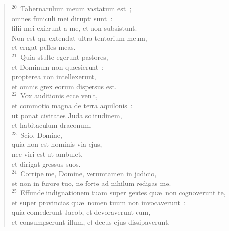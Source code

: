 \begin{flushleft}
\begin{verse}
${}^{20}$~Tabernaculum meum vastatum est~;\\ omnes funiculi mei dirupti sunt~:\\ filii mei exierunt a me, et non subsistunt.\\ Non est qui extendat ultra tentorium meum,\\ et erigat pelles meas.\\
${}^{21}$~Quia stulte egerunt pastores,\\ et Dominum non qu\ae sierunt~:\\ propterea non intellexerunt,\\ et omnis grex eorum dispersus est.\\
${}^{22}$~Vox auditionis ecce venit,\\ et commotio magna de terra aquilonis~:\\ ut ponat civitates Juda solitudinem,\\ et habitaculum draconum.\\
${}^{23}$~Scio, Domine,\\ quia non est hominis via ejus,\\ nec viri est ut ambulet,\\ et dirigat gressus suos.\\
${}^{24}$~Corripe me, Domine, verumtamen in judicio,\\ et non in furore tuo, ne forte ad nihilum redigas me.\\
${}^{25}$~Effunde indignationem tuam super gentes qu\ae\ non cognoverunt te,\\ et super provincias qu\ae\ nomen tuum non invocaverunt~:\\ quia comederunt Jacob, et devoraverunt eum,\\ et consumpserunt illum, et decus ejus dissipaverunt.\end{verse}\end{flushleft}



